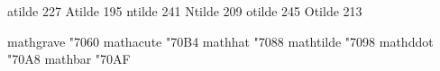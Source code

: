  atilde           227
 Atilde           195
 ntilde           241
 Ntilde           209
 otilde           245
 Otilde           213

\stopencoding


\startencoding[texnansi]

 mathgrave       "7060
 mathacute       "70B4
 mathhat         "7088
 mathtilde       "7098
 mathddot        "70A8
 mathbar         "70AF

\stopencoding

\endinput
